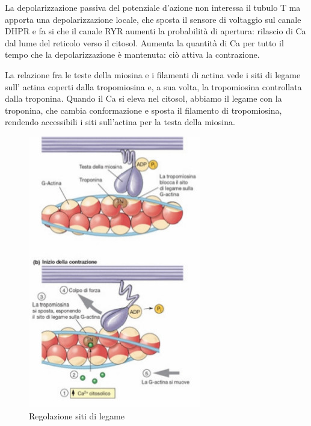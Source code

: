 \documentclass[a4paper,12pt]{article}
\begin{document}
La depolarizzazione passiva del potenziale d'azione non interessa il tubulo T ma apporta una depolarizzazione locale, che sposta il sensore di voltaggio sul canale DHPR e fa si che il canale RYR aumenti la probabilità di apertura: rilascio di Ca dal lume del reticolo verso il citosol. Aumenta la quantità di Ca per tutto il tempo che la depolarizzazione è mantenuta: ciò attiva la contrazione.

La relazione fra le teste della miosina e i filamenti di actina vede i siti di legame sull' actina coperti dalla tropomiosina e, a sua volta, la tropomiosina controllata dalla troponina. Quando il Ca si eleva nel citosol, abbiamo il legame con la troponina, che cambia conformazione e sposta il filamento di tropomiosina, rendendo accessibili i siti sull'actina per la testa della miosina.
\begin{figure}[H]
\centering
\includegraphics[scale=0.4]{immagine/siti.jpg}
\caption{Regolazione siti di legame}
\end{figure}
\end{document}
